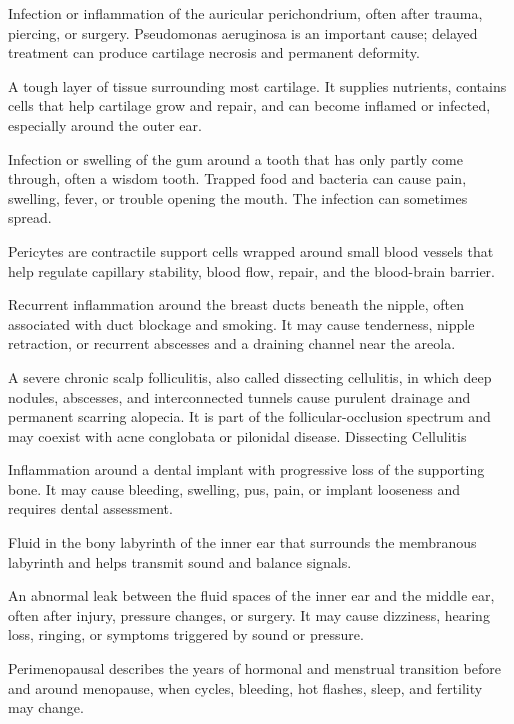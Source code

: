  Infection or inflammation of the auricular perichondrium, often after trauma, piercing,
or surgery. Pseudomonas aeruginosa is an important cause; delayed treatment can produce
cartilage necrosis and permanent deformity.

 A tough layer of tissue surrounding most cartilage. It supplies nutrients, contains cells that help cartilage grow and repair, and can become inflamed or infected, especially around the outer ear.

 Infection or swelling of the gum around a tooth that has only partly come through, often a wisdom tooth. Trapped food and bacteria can cause pain, swelling, fever, or trouble opening the mouth. The infection can sometimes spread.

 Pericytes are contractile support cells wrapped around small blood vessels that help regulate capillary stability, blood flow, repair, and the blood-brain barrier.

 Recurrent inflammation around the breast ducts beneath the nipple, often associated with duct blockage and smoking. It may cause tenderness, nipple retraction, or recurrent abscesses and a draining channel near the areola.

 A severe chronic scalp folliculitis, also called dissecting cellulitis, in which deep nodules, abscesses, and interconnected tunnels cause purulent drainage and permanent scarring alopecia. It is part of the follicular-occlusion spectrum and may coexist with acne conglobata or pilonidal disease.
\synonyms
Dissecting Cellulitis

 Inflammation around a dental implant with progressive loss of the supporting bone. It may cause bleeding, swelling, pus, pain, or implant looseness and requires dental assessment.

 Fluid in the bony labyrinth of the inner ear that surrounds the membranous labyrinth and helps transmit sound and balance signals.

 An abnormal leak between the fluid spaces of the inner ear and the middle ear, often after injury, pressure changes, or surgery. It may cause dizziness, hearing loss, ringing, or symptoms triggered by sound or pressure.

 Perimenopausal describes the years of hormonal and menstrual transition before and around menopause, when cycles, bleeding, hot flashes, sleep, and fertility may change.

